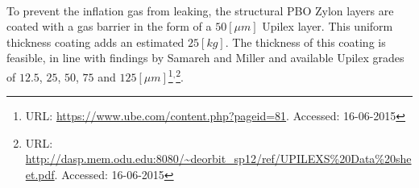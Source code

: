 To prevent the inflation gas from leaking, the structural PBO Zylon\textsuperscript{\textregistered} layers are coated with a gas barrier in the form of a $50 \left[\mu m\right]$ Upilex layer. This uniform thickness coating adds an estimated $25 \left[kg\right]$. The thickness of this coating is feasible, in line with findings by Samareh and Miller \cite{Samareh2011,Miller2014} and available Upilex grades of $12.5$, $25$, $50$, $75$ and $125 \left[\mu m\right]$\footnote{URL: \url{https://www.ube.com/content.php?pageid=81}. Accessed: 16-06-2015}$^{,}$\footnote{URL: \url{http://dasp.mem.odu.edu:8080/~deorbit_sp12/ref/UPILEXS\%20Data\%20sheet.pdf}. Accessed: 16-06-2015}.



